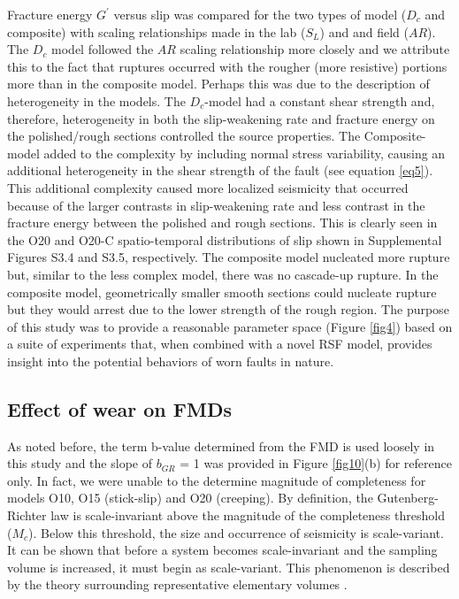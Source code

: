 \documentclass[preprint,1p, 10pt,authoryear]{elsarticle}
\begin{document}
Fracture energy $G^{'}$ versus slip was compared for the two types of model ($D_{c}$ and composite) with scaling relationships made in the lab ($S_{L}$) and and field ($AR$). The $D_{c}$ model followed the $AR$ scaling relationship more closely and we attribute this to the fact that ruptures occurred with the rougher (more resistive) portions more than in the composite model.  Perhaps this was due to the description of heterogeneity in the models. The $D_{c}$-model had a constant shear strength and, therefore, heterogeneity in both the slip-weakening rate and fracture energy on the polished/rough sections controlled the source properties. The Composite-model added to the complexity by including normal stress variability, causing an additional heterogeneity in the shear strength of the fault (see equation \eqref{eq5}). This additional complexity caused more localized seismicity that occurred because of the larger contrasts in slip-weakening rate and less contrast in the fracture energy between the polished and rough sections. This is clearly seen in the O20 and O20-C spatio-temporal distributions of slip shown in Supplemental Figures S3.4 and S3.5, respectively.  The composite model nucleated more rupture but, similar to the less complex model, there was no cascade-up rupture.  In the composite model, geometrically smaller smooth sections could nucleate rupture but they would arrest due to the lower strength of the rough region. The purpose of this study was to provide a reasonable parameter space (Figure \ref{fig4}) based on a suite of experiments that, when combined with a novel RSF model, provides insight into the potential behaviors of worn faults in nature.

\subsection{Effect of wear on FMDs}
As noted before, the term b-value determined from the FMD is used loosely in this study and the slope of $b_{GR}$ = 1 was provided in Figure \ref{fig10}(b) for reference only. In fact, we were unable to the determine magnitude of completeness for models O10, O15 (stick-slip) and O20 (creeping). By definition, the Gutenberg-Richter law is scale-invariant above the magnitude of the completeness threshold ($M_{c}$). Below this threshold, the size and occurrence of seismicity is scale-variant. It can be shown that before a system becomes scale-invariant and the sampling volume is increased, it must begin as scale-variant. This phenomenon is described by the theory surrounding representative elementary volumes \citep{Hill1963}.
\end{document}

